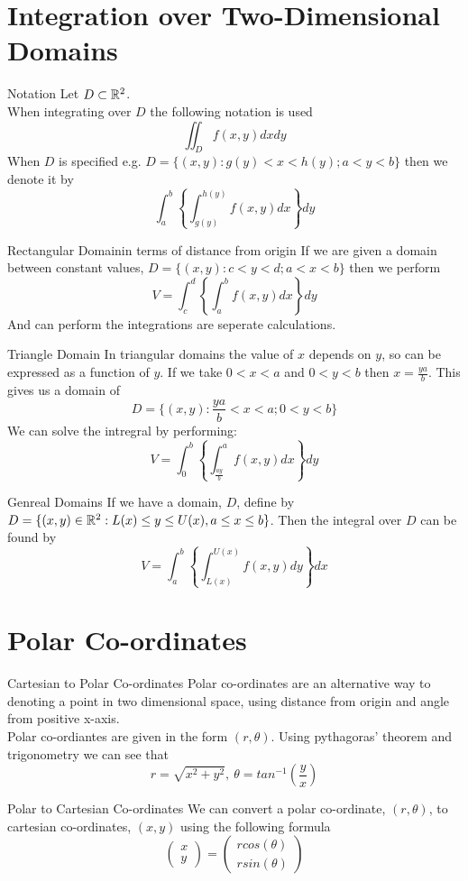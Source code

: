 \documentclass[11pt,a4paper]{article}
\begin{document}
\section{Integration over Two-Dimensional Domains}

\subtitle{Remark 12.1 - }{Notation}
Let $D \subset \mathbb{R}^2$.\\
When integrating over $D$ the following notation is used $$\iint_D f(x, y) dx dy$$
When $D$ is specified e.g. $D = \{(x, y) : g(y) < x < h(y); a < y < b\}$ then we denote it by $$\int_{a}^{b} \left\{\int_{g(y)}^{h(y)} f(x, y) dx \right\} dy$$

\subtitle{Theorem 12.2 - }{Rectangular Domain}in terms of distance from origin
If we are given a domain between constant values, $D = \{(x, y) : c < y < d; a < x < b\}$ then we perform
$$V = \int_{c}^{d} \left\{\int_{a}^{b} f(x, y) dx \right\} dy$$
And can perform the integrations are seperate calculations.

\subtitle{Theorem 12.3 - }{Triangle Domain}
In triangular domains the value of $x$ depends on $y$, so can be expressed as a function of $y$. If we take $0 < x < a$ and $0 < y < b$ then $x = \frac{ya}{b}$.
This gives us a domain of $$D = \{(x, y): \frac{ya}{b} < x < a; 0 < y < b\}$$
We can solve the intregral by performing: $$V = \int_{0}^{b} \left\{ \int_{\frac{ay}{b}}^{a} f(x, y) dx \right\} dy$$

\subtitle{Theorem 12.4 - }{Genreal Domains}
If we have a domain, $D$, define by $D = \{(x, y) \in \mathbb{R}^2: L(x) \leq y \leq U(x), a \leq x \leq b\}$. Then the integral over $D$ can be found by
$$V=\int_{a}^{b} \left\{ \int_{L(x)}^{U(x)} f(x,y) dy \right\} dx$$

\section{Polar Co-ordinates}

\subtitle{Defintion 13.1 - }{Cartesian to Polar Co-ordinates}
Polar co-ordinates are an alternative way to denoting a point in two dimensional space, using distance from origin and angle from positive x-axis.\\
Polar co-ordiantes are given in the form $(r, \theta)$. Using pythagoras' theorem and trigonometry we can see that $$r = \sqrt{x^2 + y^2},\ \theta = tan^{-1}\left(\frac{y}{x}\right)$$

\subtitle{Theorem 13.2 - }{Polar to Cartesian Co-ordinates}
We can convert a polar co-ordinate, $(r, \theta)$, to cartesian co-ordinates, $(x, y)$ using the following formula
$$\begin{pmatrix} x \\ y \end{pmatrix} = \begin{pmatrix} rcos(\theta) \\ rsin(\theta) \end{pmatrix}$$
\end{document}
